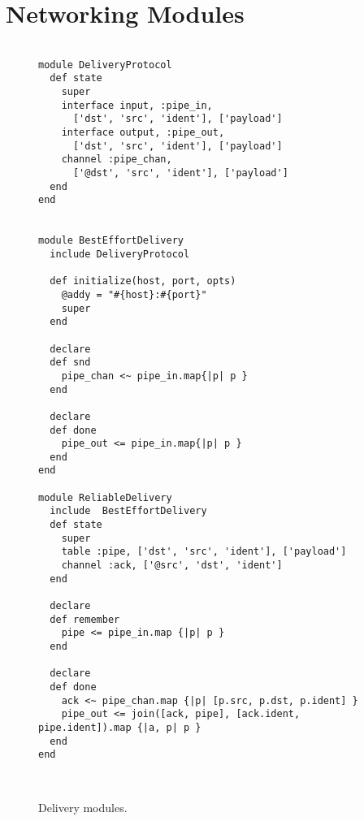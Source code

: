 \section{Networking Modules}

\begin{figure}[t]
\begin{scriptsize}
\begin{lstlisting}

module DeliveryProtocol
  def state
    super
    interface input, :pipe_in,
      ['dst', 'src', 'ident'], ['payload']
    interface output, :pipe_out,
      ['dst', 'src', 'ident'], ['payload']
    channel :pipe_chan,
      ['@dst', 'src', 'ident'], ['payload']
  end
end


module BestEffortDelivery
  include DeliveryProtocol

  def initialize(host, port, opts)
    @addy = "#{host}:#{port}"
    super
  end

  declare
  def snd
    pipe_chan <~ pipe_in.map{|p| p }
  end

  declare
  def done
    pipe_out <= pipe_in.map{|p| p }
  end
end

module ReliableDelivery
  include  BestEffortDelivery
  def state
    super
    table :pipe, ['dst', 'src', 'ident'], ['payload']
    channel :ack, ['@src', 'dst', 'ident']
  end

  declare
  def remember
    pipe <= pipe_in.map {|p| p }
  end

  declare
  def done
    ack <~ pipe_chan.map {|p| [p.src, p.dst, p.ident] }
    pipe_out <= join([ack, pipe], [ack.ident, pipe.ident]).map {|a, p| p }
  end
end



\end{lstlisting}
\centering
\vspace{-10pt}
\caption{Delivery modules.}
\label{fig:kvs-impl}
\end{scriptsize}
\vspace{-2pt}
\end{figure}


